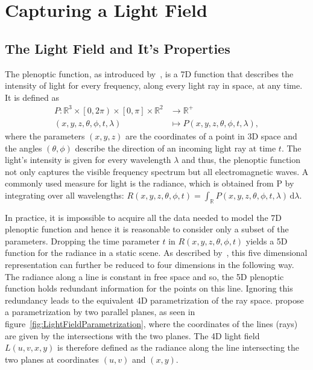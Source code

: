 \chapter{Capturing a Light Field}

\section{The Light Field and It's Properties}

The plenoptic function, as introduced by~\cite{AdelsonBergen}, is a 7D function that describes the intensity of light for every frequency, along every light ray in space, at any time. 
It is defined as
\begin{align*}
	P \colon \mathbb{R}^3 \times \left[0, 2 \pi \right) \times \left[ 0, \pi \right] \times \mathbb{R}^2 & \to \mathbb{R}^+ \\
	\left(x, y, z, \theta, \phi, t, \lambda \right) & \mapsto P\left(x, y, z, \theta, \phi, t, \lambda \right), 
\end{align*}
where the parameters $\left(x, y, z\right)$ are the coordinates of a point in 3D space and the angles $\left(\theta, \phi \right)$ describe the direction of an incoming light ray at time $t$. 
The light's intensity is given for every wavelength $\lambda$ and thus, the plenoptic function not only captures the visible frequency spectrum but all electromagnetic waves. 
A commonly used measure for light is the radiance, which is obtained from P by integrating over all wavelengths: 
$R\left(x, y, z, \theta, \phi, t\right) = \int_{\mathbb{R}} \! P\left(x, y, z, \theta, \phi, t, \lambda \right) \, \mathrm{d} \lambda$.

In practice, it is impossible to acquire all the data needed to model the 7D plenoptic function and hence it is reasonable to consider only a subset of the parameters. 
Dropping the time parameter $t$ in $R\left( x, y, z, \theta, \phi, t \right) $ yields a 5D function for the radiance in a static scene. 
As described by~\cite{LightFieldRendering}, this five dimensional representation can further be reduced to four dimensions in the following way. 
The radiance along a line is constant in free space and so, the 5D plenoptic function holds redundant information for the points on this line. 
Ignoring this redundancy leads to the equivalent 4D parametrization of the ray space. 
\cite{LightFieldRendering} propose a parametrization by two parallel planes, as seen in figure~\ref{fig:LightFieldParametrization}, where the coordinates of the lines (rays) are given by the intersections with the two planes.
The 4D light field $L(u, v, x, y)$ is therefore defined as the radiance along the line intersecting the two planes at coordinates $(u, v)$ and $(x, y)$.



